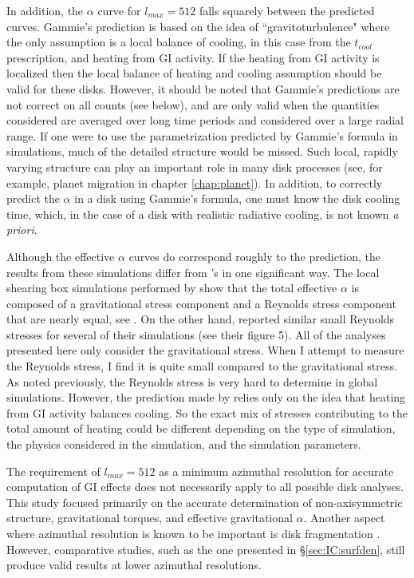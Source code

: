 In addition, the $\alpha$ curve for $l_{max} = 512$ falls squarely between the \citeauthor{gammie2001} predicted curves. Gammie's prediction is based on the idea of ``gravitoturbulence" where the only assumption is a local balance of cooling, in this case from the $t_{cool}$ prescription, and heating from GI activity. If the heating from GI activity is localized then the local balance of heating and cooling assumption should be valid for these disks. However, it should be noted that Gammie's predictions are not correct on all counts (see below), and are only valid when the quantities considered are averaged over long time periods and considered over a large radial range. If one were to use the parametrization predicted by Gammie's formula in simulations, much of the detailed structure would be missed. Such local, rapidly varying structure can play an important role in many disk processes (see, for example, planet migration in chapter \ref{chap:planet}). In addition, to correctly predict the $\alpha$ in a disk using Gammie's formula, one must know the disk cooling time, which, in the case of a disk with realistic radiative cooling, is not known {\it a priori}.

Although the effective $\alpha$ curves do correspond roughly to the \citeauthor{gammie2001} prediction, the results from these simulations differ from \citeauthor{gammie2001}'s in one significant way. The local shearing box simulations performed by \citet{gammie2001} show that the total effective $\alpha$ is composed of a gravitational stress component and a Reynolds stress component that are nearly equal, see \citet[figure 3]{gammie2001}. On the other hand, \citet{lodato2004} reported similar small Reynolds stresses for several of their simulations (see their figure 5). All of the analyses presented here only consider the gravitational stress. When I attempt to measure the Reynolds stress, I find it is quite small compared to the gravitational stress. As noted previously, the Reynolds stress is very hard to determine in global simulations. However, the prediction made by \citeauthor{gammie2001} relies only on the idea that heating from GI activity balances cooling. So the exact mix of stresses contributing to the total amount of heating could be different depending on the type of simulation, the physics considered in the simulation, and the simulation parameters. 

The requirement of $l_{max} =512$ as a minimum azimuthal resolution for accurate computation of GI effects does not necessarily apply to all possible disk analyses. This study focused primarily on the accurate determination of non-axisymmetric structure, gravitational torques, and effective gravitational $\alpha$. Another aspect where azimuthal resolution is known to be important is disk fragmentation \citep{pickett2003}. However, comparative studies, such as the one presented in \S\ref{sec:IC:surfden}, still produce valid results at lower azimuthal resolutions.

